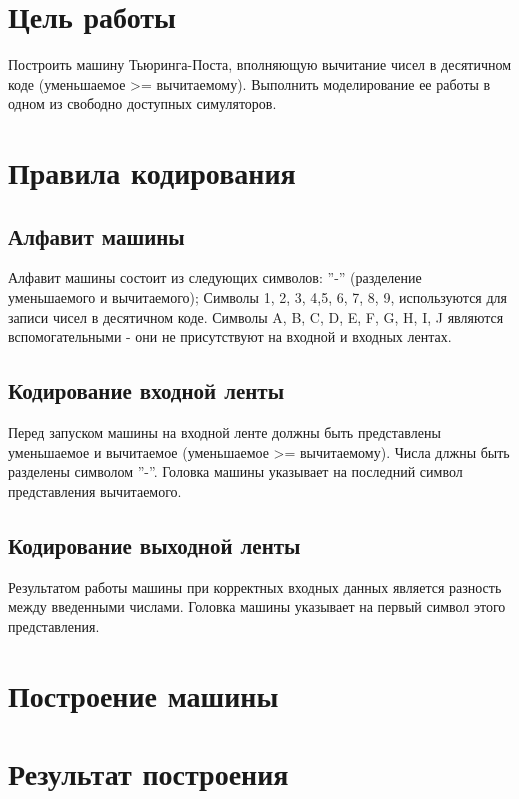 






\section{Цель работы}
Построить машину Тьюринга-Поста, вполняющую вычитание чисел в десятичном коде (уменьшаемое >= вычитаемому). Выполнить моделирование ее работы в одном из свободно доступных симуляторов. 

\section{Правила кодирования}

\subsection{Алфавит машины}
Алфавит машины состоит из следующих символов: ''-'' (разделение уменьшаемого и вычитаемого); Символы 1, 2, 3, 4,5, 6, 7, 8, 9,  используются для записи чисел в десятичном коде. Символы A, B, C, D, E, F, G, H, I, J являются вспомогательными - они не присутствуют на входной и входных лентах.

\subsection{Кодирование входной ленты}
Перед запуском машины на входной ленте должны быть представлены уменьшаемое и вычитаемое (уменьшаемое >= вычитаемому). Числа длжны быть разделены символом ''-''. Головка машины указывает на последний символ представления вычитаемого.

\subsection{Кодирование выходной ленты}
Результатом работы машины при корректных входных данных является разность между введенными числами. Головка машины указывает на первый символ этого представления.

\section{Построение машины}

\section{Результат построения}

